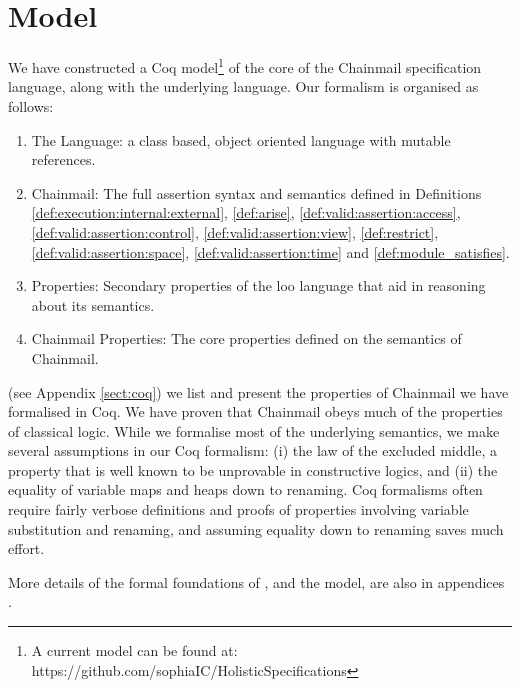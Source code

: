\section{Model}
\label{sect:model}

We have constructed a Coq model\footnote{A current model can be found at: https://github.com/sophiaIC/HolisticSpecifications} \cite{coq} of the core of the Chainmail
specification language, along with the underlying \LangOO language.
Our formalism is organised as follows:
\begin{enumerate}
\item
The \LangOO Language: a class based, object oriented language with mutable references.
\item
Chainmail: The full assertion syntax and semantics defined in Definitions \ref{def:execution:internal:external}, \ref{def:arise}, \ref{def:valid:assertion:access}, \ref{def:valid:assertion:control}, \ref{def:valid:assertion:view}, \ref{def:restrict}, \ref{def:valid:assertion:space}, %
\ref{def:valid:assertion:time} and \ref{def:module_satisfies}.
\item
\LangOO Properties: Secondary properties of the loo language that aid in reasoning about its semantics.
\item
Chainmail Properties: The core properties defined on the semantics of Chainmail.
\end{enumerate}

 (see Appendix \ref{sect:coq}) we list and present the properties of Chainmail we have formalised in Coq.
We have proven that Chainmail obeys much of the properties of classical logic. While we formalise most of the underlying semantics, we make several assumptions in our Coq formalism: (i) the law of the excluded middle,  a property that is well known to be unprovable in constructive logics, and (ii) the equality of variable maps and heaps down to renaming. Coq formalisms often require fairly verbose definitions and proofs of properties involving variable substitution and renaming, and assuming equality down to renaming saves much effort.

More details of the formal foundations of \Chainmail, and the model,
are also in appendices \cite{examples}.

